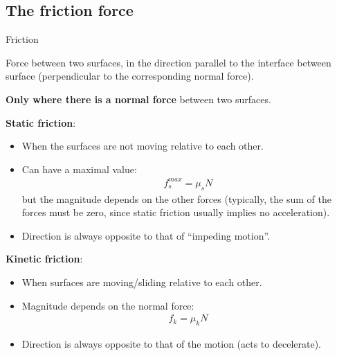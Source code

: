 \documentclass[aspectratio=169,
hyperref={colorlinks,urlcolor=blue}
]{beamer}
\begin{document}
\subsection{The friction force}
\label{subsec:thefrictionforce}
\begin{bulletframe}{Friction}
\item Force between two surfaces, in the direction parallel to the interface between surface (perpendicular to the corresponding normal force).
\item \textbf{Only where there is a normal force} between two surfaces.
\item \textbf{Static friction}:
\begin{itemize}
\item When the surfaces are not moving relative to each other.
\item Can have a maximal value:
\begin{align*}
f_s^{max}=\mu_s N
\end{align*}
but the magnitude depends on the other forces (typically, the sum of the forces must be zero, since static friction usually implies no acceleration).
\item Direction is always opposite to that of ``impeding motion''.
\end{itemize}
\item \textbf{Kinetic friction}:
\begin{itemize}
\item When surfaces are moving/sliding relative to each other.
\item Magnitude depends on the normal force:
\begin{align*}
f_k=\mu_k N
\end{align*}
\item Direction is always opposite to that of the motion (acts to decelerate).
\end{itemize}
\end{bulletframe}




\end{document}
